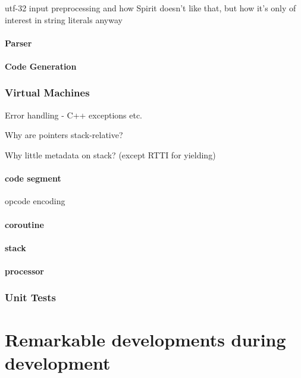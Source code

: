             utf-32 input preprocessing and how Spirit doesn't like that, but how it's only of interest in string literals anyway
            
            \subsubsection{Parser}
            
            \subsubsection{Code Generation}
            
        \subsection{Virtual Machines}
        
            Error handling - C++ exceptions etc.
            
            Why are pointers stack-relative?
            
            Why little metadata on stack? (except RTTI for yielding)
            
            \subsubsection{code segment}
                opcode encoding
            \subsubsection{coroutine}
            \subsubsection{stack}
            \subsubsection{processor}
        
        \subsection{Unit Tests}


\chapter{Remarkable developments during development} %

